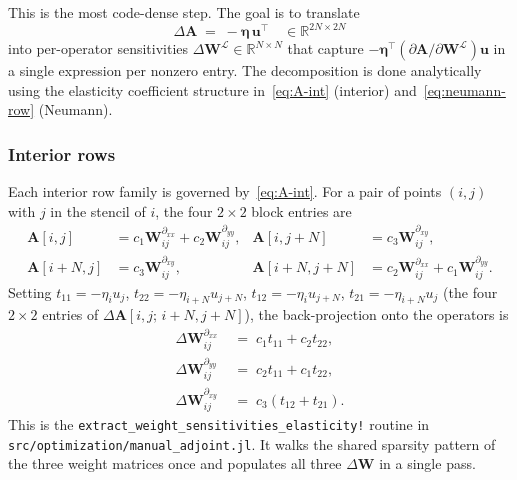 \documentclass[11pt,a4paper]{article}
\newcommand{\mat}[1]{\mathbf{#1}}
\newcommand{\vect}[1]{\boldsymbol{#1}}
\newcommand{\reals}{\mathbb{R}}
\begin{document}
This is the most code-dense step. The goal is to translate
\begin{equation}
  \Delta\mat A
  \;=\; -\vect\eta\,\vect u^\top
  \quad \in \reals^{2N \times 2N}
\end{equation}
into per-operator sensitivities $\Delta\mat W^{\mathcal L}
\in \reals^{N \times N}$ that capture
$-\vect\eta^\top(\partial\mat A/\partial\mat W^{\mathcal L})\vect u$
in a single expression per nonzero entry. The decomposition is
done analytically using the elasticity coefficient structure
in~\eqref{eq:A-int} (interior) and~\eqref{eq:neumann-row} (Neumann).

\subsubsection{Interior rows}

Each interior row family is governed by~\eqref{eq:A-int}. For a pair
of points $(i, j)$ with $j$ in the stencil of $i$, the four
$2\times 2$ block entries are
\begin{align}
  \mat A[i,j]      &= c_1 \mat W^{\partial_{xx}}_{ij} + c_2 \mat W^{\partial_{yy}}_{ij},
  & \mat A[i, j{+}N]   &= c_3 \mat W^{\partial_{xy}}_{ij}, \\
  \mat A[i{+}N, j] &= c_3 \mat W^{\partial_{xy}}_{ij},
  & \mat A[i{+}N, j{+}N] &= c_2 \mat W^{\partial_{xx}}_{ij} + c_1 \mat W^{\partial_{yy}}_{ij}.
\end{align}
Setting $t_{11} = -\eta_i u_j$, $t_{22} = -\eta_{i+N} u_{j+N}$,
$t_{12} = -\eta_i u_{j+N}$, $t_{21} = -\eta_{i+N} u_j$ (the four
$2{\times}2$ entries of $\Delta\mat A[i,j;\, i+N, j+N]$), the
back-projection onto the operators is
\begin{equation}
  \boxed{\;
  \begin{aligned}
    \Delta\mat W^{\partial_{xx}}_{ij} \;&=\; c_1 t_{11} + c_2 t_{22}, \\
    \Delta\mat W^{\partial_{yy}}_{ij} \;&=\; c_2 t_{11} + c_1 t_{22}, \\
    \Delta\mat W^{\partial_{xy}}_{ij} \;&=\; c_3 (t_{12} + t_{21}).
  \end{aligned}
  \;}
  \label{eq:interior-extract}
\end{equation}
This is the \texttt{extract\_weight\_sensitivities\_elasticity!}
routine in \texttt{src/optimization/manual\_adjoint.jl}. It walks
the shared sparsity pattern of the three weight matrices once and
populates all three $\Delta\mat W$ in a single pass.
\end{document}

